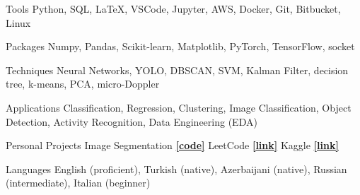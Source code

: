 

\begin{cvskills}

  \cvskill
    {Tools} %
    {Python, SQL, \LaTeX, VSCode, Jupyter, AWS, Docker, Git, Bitbucket, Linux} %

  \cvskill
    {Packages} %
    {Numpy, Pandas, Scikit-learn, Matplotlib, PyTorch, TensorFlow, socket} %

  \cvskill
    {Techniques} %
    {Neural Networks, YOLO, DBSCAN, SVM, Kalman Filter, decision tree, k-means, PCA, micro-Doppler} %
    
  \cvskill
    {Applications} %
    {Classification, Regression, Clustering, Image Classification, Object Detection, Activity Recognition, Data Engineering (EDA)} %
    

  \cvskill
    {Personal Projects} %
    {Image Segmentation \href{https://github.com/enverbashirov/Image-Segmentation-Superpixels}{\textbf{[code]}} LeetCode \href{https://leetcode.com/enverbashirov/}{\textbf{[link]}} Kaggle \href{https://www.kaggle.com/enverbashirov}{\textbf{[link]}}} %

  \hline
  
  \cvskill
    {Languages} %
    {English (proficient), Turkish (native), Azerbaijani (native), Russian (intermediate), Italian (beginner)} %




\end{cvskills}
